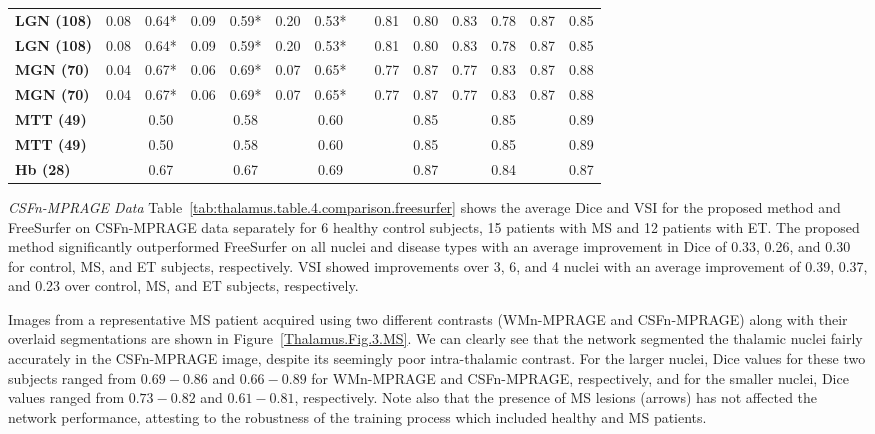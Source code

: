 \begin{table}[htbp]
{\begin{tabular}{lccccccccccccc}
  \rowcolor[HTML]{FFFFFF}
  \cellcolor[HTML]{D9D9D9}\textbf{LGN (108)} & 0.08 & 0.64* & 0.09 & 0.59* & 0.20 & 0.53* & & 0.81 & 0.80 & 0.83 & 0.78 & 0.87 & 0.85 \\
  \cellcolor[HTML]{D9D9D9}\textbf{LGN (108)} & 0.08 & 0.64* & 0.09 & 0.59* & 0.20 & 0.53* & & 0.81 & 0.80 & 0.83 & 0.78 & 0.87 & 0.85 \\
  \rowcolor[HTML]{FFFFFF}
  \cellcolor[HTML]{D9D9D9}\textbf{MGN (70)} & 0.04 & 0.67* & 0.06 & 0.69* & 0.07 & 0.65* & & 0.77 & 0.87 & 0.77 & 0.83 & 0.87 & 0.88 \\
  \cellcolor[HTML]{D9D9D9}\textbf{MGN (70)} & 0.04 & 0.67* & 0.06 & 0.69* & 0.07 & 0.65* & & 0.77 & 0.87 & 0.77 & 0.83 & 0.87 & 0.88 \\
  \rowcolor[HTML]{FFFFFF}
  \cellcolor[HTML]{D9D9D9}\textbf{MTT (49)} & & 0.50 & & 0.58 & & 0.60 & & & 0.85 & & 0.85 & & 0.89 \\
  \cellcolor[HTML]{D9D9D9}\textbf{MTT (49)} & & 0.50 & & 0.58 & & 0.60 & & & 0.85 & & 0.85 & & 0.89 \\
  \rowcolor[HTML]{FFFFFF}
  \cellcolor[HTML]{D9D9D9}\textbf{Hb (28)} & & 0.67 & & 0.67 & & 0.69 & & & 0.87 & & 0.84 & & 0.87
  \end{tabular}
  }
\end{table}

\emph{CSFn-MPRAGE Data}
Table~\ref{tab:thalamus.table.4.comparison.freesurfer}  shows the average Dice and VSI for the proposed method and FreeSurfer on CSFn-MPRAGE data separately for 6 healthy control subjects, 15 patients with MS and 12 patients with ET\@. The proposed method significantly outperformed FreeSurfer on all nuclei and disease types with an average improvement in Dice of 0.33, 0.26, and 0.30 for control, MS, and ET subjects, respectively. VSI showed improvements over 3, 6, and 4 nuclei with an average improvement of 0.39, 0.37, and 0.23 over control, MS, and ET subjects, respectively.


Images from a representative MS patient acquired using two different contrasts (WMn-MPRAGE and CSFn-MPRAGE) along with their overlaid segmentations are shown in Figure~\ref{Thalamus.Fig.3.MS}. We can clearly see that the network segmented the thalamic nuclei fairly accurately in the CSFn-MPRAGE image, despite its seemingly poor intra-thalamic contrast. For the larger nuclei, Dice values for these two subjects ranged from $0.69-0.86$ and $0.66-0.89$ for WMn-MPRAGE and CSFn-MPRAGE, respectively, and for the smaller nuclei, Dice values ranged from $0.73-0.82$ and $0.61-0.81$, respectively. Note also that the presence of MS lesions (arrows) has not affected the network performance, attesting to the robustness of the training process which included healthy and MS patients.

